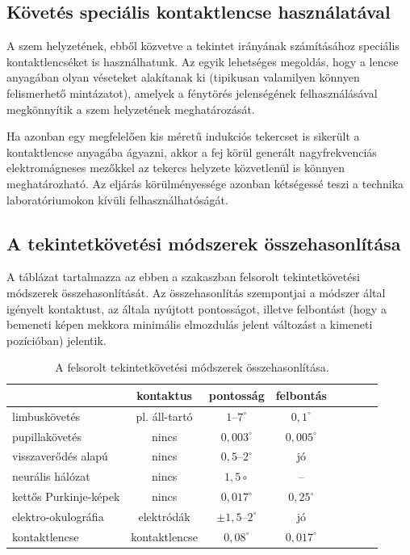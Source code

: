 \subsection{Követés speciális kontaktlencse használatával}\label{sect:kontakt}

A szem helyzetének, ebből közvetve a tekintet irányának számításához speciális kontaktlencséket is használhatunk. Az egyik lehetséges megoldás, hogy a lencse anyagában olyan véseteket alakítanak ki (tipikusan valamilyen könnyen felismerhető mintázatot), amelyek a fénytörés jelenségének felhasználásával megkönnyítik a szem helyzetének meghatározását.

Ha azonban egy megfelelően kis méretű indukciós tekercset is sikerült a kontaktlencse anyagába ágyazni, akkor a fej körül generált nagyfrekvenciás elektromágneses mezőkkel az tekercs helyzete közvetlenül is könnyen meghatározható. Az eljárás körülményessége azonban kétségessé teszi a technika laboratóriumokon kívüli felhasználhatóságát.


\subsection{A tekintetkövetési módszerek összehasonlítása}\label{sect:tekintet_osszehas}

A  táblázat tartalmazza az ebben a szakaszban felsorolt tekintetkövetési módszerek összehasonlítását. Az összehasonlítás szempontjai a módszer által igényelt kontaktust, az általa nyújtott pontosságot, illetve felbontást (hogy a bemeneti képen mekkora minimális elmozdulás jelent változást a kimeneti pozícióban) jelentik. 

\begin{table}[ht]
	\centering
	\caption{A felsorolt tekintetkövetési módszerek összehasonlítása.} \label{tab:osszehas}
	\begin{tabular}{ l || c | c | c | c | c | c | c }
	 & kontaktus & pontosság & felbontás \\ \hline \hline
	limbuskövetés & pl. áll-tartó & $1$--$7^\circ$ & $0,\!1^\circ$ \\
	pupillakövetés & nincs & $0,\!003^\circ$ & $0,\!005^\circ$ \\
	visszaverődés alapú & nincs & $0,\!5$--$2^\circ$ & jó \\
	neurális hálózat & nincs & $1,\!5\circ$ & -- \\
	kettős Purkinje-képek & nincs & $0,\!017^\circ$ & $0,\!25^\circ$ \\ 
	elektro-okulográfia & elektródák & $\pm1,\!5$--$2^\circ$ & jó \\
	kontaktlencse & kontaktlencse & $0,\!08^\circ$ & $0,\!017^\circ$ \\
	\end{tabular}
\end{table}

